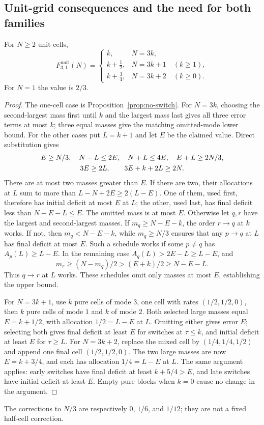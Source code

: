 \subsection{Unit-grid consequences and the need for both families}
\begin{corollary}\label{cor:three-unit-one}
For $N\ge2$ unit cells,
\begin{equation}\label{eq:three-unit-one}
 F^{\mathrm{unit}}_{3,1}(N)=
 \begin{cases}
 k,&N=3k,\\
 k+\tfrac12,&N=3k+1\quad(k\ge1),\\
 k+\tfrac34,&N=3k+2\quad(k\ge0).
 \end{cases}
\end{equation}
For $N=1$ the value is $2/3$.
\end{corollary}
\begin{proof}
The one-cell case is Proposition~\ref{prop:no-switch}.
For $N=3k$, choosing the second-largest mass first until $k$ and the
largest mass last gives all three error terms at most $k$; three equal
masses give the matching omitted-mode lower bound.
For the other cases put $L=k+1$ and let $E$ be the claimed value. Direct
substitution gives
\begin{gather}\label{eq:residue-inequalities}
 E\ge N/3,\quad N-L\le2E,\quad N+L\le4E,\quad E+L\ge2N/3,\notag\\
 3E\ge2L,\qquad 3E+k+2L\ge2N.
\end{gather}
There are at most two masses greater than $E$. If there are two, their
allocations at $L$ sum to more than $L-N+2E\ge2(L-E)$.
One of them, used first, therefore has initial deficit at most $E$ at
$L$; the other, used last, has final deficit less than $N-E-L\le E$.
The omitted mass is at most $E$.
Otherwise let $q,r$ have the largest and second-largest masses. If
$m_q\ge N-E-k$, the order $r\to q$ at $k$ works. If not, then
$m_q<N-E-k$, while $m_q\ge N/3$ ensures that any $p\to q$ at $L$
has final deficit at most $E$. Such a schedule works if some $p\ne q$
has $A_p(L)\ge L-E$. In the remaining case
$A_q(L)>2E-L\ge L-E$, and
\[
 m_r\ge(N-m_q)/2>(E+k)/2\ge N-E-L.
\]
Thus $q\to r$ at $L$ works. These schedules omit only masses at most
$E$, establishing the upper bound.

For $N=3k+1$, use $k$ pure cells of mode $3$, one cell with rates
$(1/2,1/2,0)$, then $k$ pure cells of mode $1$ and $k$ of mode $2$.
Both selected large masses equal $E=k+1/2$, with allocation $1/2=L-E$
at $L$. Omitting either gives error $E$; selecting both gives final
deficit at least $E$ for switches at $\tau\le k$, and initial deficit
at least $E$ for $\tau\ge L$.
For $N=3k+2$, replace the mixed cell by $(1/4,1/4,1/2)$ and append
one final cell $(1/2,1/2,0)$. The two large masses are now $E=k+3/4$,
and each has allocation $1/4=L-E$ at $L$. The same argument applies:
early switches have final deficit at least $k+5/4>E$, and late switches
have initial deficit at least $E$. Empty pure blocks when $k=0$ cause
no change in the argument.
\end{proof}
The corrections to $N/3$ are respectively $0$, $1/6$, and $1/12$;
they are not a fixed half-cell correction.

